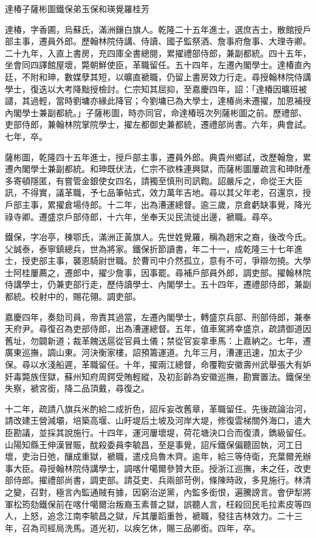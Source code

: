 
\begin{pinyinscope}
達椿子薩彬圖鐵保弟玉保和瑛覺羅桂芳

達椿，字香圃，烏蘇氏，滿洲鑲白旗人。乾隆二十五年進士，選庶吉士，散館授戶部主事，遷員外郎。歷翰林院侍講、侍讀、國子監祭酒、詹事府詹事、大理寺卿。二十九年，入直上書房，充四庫全書總閱，累擢禮部侍郎，兼副都統。四十五年，坐會同四譯館屋壞，斃朝鮮使臣，革職留任。五十四年，左遷內閣學士。達椿直內廷，不附和珅，數媒孽其短，以曠直褫職，仍留上書房效力行走。尋授翰林院侍講學士，復迭以大考降黜授檢討。仁宗知其屈抑，至嘉慶四年，詔：「達椿因曠班被譴，其過輕，當時劉墉亦緣此降官；今劉墉已為大學士，達椿尚未遷擢，加恩補授內閣學士兼副都統。」子薩彬圖，時亦同官，命達椿班次列薩彬圖之前。歷禮部、吏部侍郎，兼翰林院掌院學士，擢左都御史兼都統，遷禮部尚書。六年，典會試。七年，卒。

薩彬圖，乾隆四十五年進士，授戶部主事，遷員外郎。典貴州鄉試，改歷翰詹，累遷內閣學士兼副都統。和珅既伏法，仁宗不欲株連興獄，而薩彬圖屢疏言和珅財產多寄頓隱匿，有嘗管金銀使女四名，請獨至慎刑司訊鞫。詔嚴斥之，命從王大臣訊，不得實，議革職，予七品筆帖式，效力萬年吉地。尋以其父年老，召還京，授戶部主事，累擢倉場侍郎。十二年，出為漕運總督。逾三歲，京倉虧缺事覺，降光祿寺卿。遷盛京戶部侍郎，十六年，坐奉天災民流徙出邊，褫職。尋卒。

鐵保，字冶亭，棟鄂氏，滿洲正黃旗人。先世姓覺羅，稱為趙宋之裔，後改今氏。父誠泰，泰寧鎮總兵，世為將家。鐵保折節讀書，年二十一，成乾隆三十七年進士，授吏部主事，襲恩騎尉世職。於曹司中介然孤立，意有不可，爭辯勿撓。大學士阿桂屢薦之，遷郎中，擢少詹事，因事罷。尋補戶部員外郎，調吏部。擢翰林院侍講學士，仍兼吏部行走，歷侍讀學士、內閣學士。五十四年，遷禮部侍郎，兼副都統。校射中的，賜花翎。調吏部。

嘉慶四年，奏劾司員，帝責其過當，左遷內閣學士，轉盛京兵部、刑部侍郎，兼奉天府尹。尋復召為吏部侍郎，出為漕運總督。五年，值車駕將幸盛京，疏請御道因舊址，勿闢新道；裁革餽送扈從官員土儀；禁從官妄拿車馬：上嘉納之。七年，遷廣東巡撫，調山東。河決衡家樓，詔預籌運道。九年三月，漕運迅速，加太子少保。尋以水淺船遲，革職留任。十年，擢兩江總督，命覆鞫安徽壽州武舉張大有妒奸毒斃族侄獄，蘇州知府周鍔受賄輕縱，及初彭齡為安徽巡撫，勘實置法。鐵保坐失察，褫宮銜，降二品頂戴，尋復之。

十二年，疏請八旗兵米酌給二成折色，詔斥妄改舊章，革職留任。先後疏論治河，請改建王營減壩，培築高堰、山盱堤后土坡及河岸大堤，修復雲梯關外海口，遣大臣勘議，並採其說施行。十四年，運河屢壞堤，荷花塘決口合而復潰，鐫級留任。山陽知縣王伸漢冒賑，酖殺委員李毓昌，至是事覺，詔斥鐵保偏聽固執，河工日壞，吏治日弛，釀成重獄，褫職，遣戍烏魯木齊。逾年，給三等侍衛，充葉爾羌辦事大臣。尋授翰林院侍講學士，調喀什噶爾參贊大臣。授浙江巡撫，未之任，改吏部侍郎。擢禮部尚書，調吏部。請芟吏、兵兩部苛例，條陳時政，多見施行。林清之變，召對，極言內監通賊有據，因窮治逆黨，內監多銜恨，遍騰謗言。會伊犁將軍松筠劾鐵保前在喀什噶爾治叛裔玉素普之獄，誤聽人言，枉殺回民毛拉素皮等四人，上怒，追念江南李毓昌之獄，斥其屢蹈重咎，褫職，發往吉林效力。二十三年，召為司經局洗馬。道光初，以疾乞休，賜三品卿銜。四年，卒。


\end{pinyinscope}
